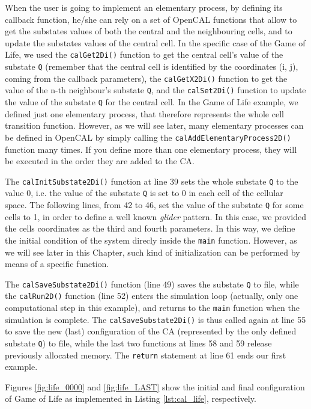 When the user is going to implement an elementary process, by defining
its callback function, he/she can rely on a set of OpenCAL functions that
allow to get the substates values of both the central and the
neighbouring cells, and to update the substates values of the central
cell. In the specific case of the Game of Life, we used the
\verb'calGet2Di()' function to get the central cell's value of the
substate \verb'Q' (remember that the central cell is identified by the
coordinates (i, j), coming from the callback parameters), the
\verb'calGetX2Di()' function to get the value of the n-th neighbour's
substate \verb'Q', and the \verb'calSet2Di()' function to update the
value of the substate \verb'Q' for the central cell. In the Game of
Life example, we defined just one elementary process, that therefore
represents the whole cell transition function. However, as we will see
later, many elementary processes can be defined in OpenCAL by simply
calling the \verb'calAddElementaryProcess2D()' function many times. If
you define more than one elementary process, they will be executed in
the order they are added to the CA.

The \verb'calInitSubstate2Di()' function at line 39 sets the whole
substate \verb'Q' to the value 0, i.e. the value of the substate
\verb'Q' is set to 0 in each cell of the cellular space. The following
lines, from 42 to 46, set the value of the substate \verb'Q' for some
cells to 1, in order to define a well known \emph{glider} pattern. In
this case, we provided the cells coordinates as the third and fourth
parameters. In this way, we define the initial condition of the system
direcly inside the \verb'main' function. However, as we will see later
in this Chapter, such kind of initialization can be performed by means
of a specific function.

The \verb'calSaveSubstate2Di()' function (line 49) saves the substate
\verb'Q' to file, while the \verb'calRun2D()' function (line 52)
enters the simulation loop (actually, only one computational step in
this example), and returns to the \verb'main' function when the
simulation is complete. The \verb'calSaveSubstate2Di()' is thus called
again at line 55 to save the new (last) configuration of the CA
(represented by the only defined substate \verb'Q') to file, while the
last two functions at lines 58 and 59 release previously allocated memory. The
\verb'return' statement at line 61 ends our first example.

Figures \ref{fig:life_0000} and \ref{fig:life_LAST} show the initial and final configuration of Game of Life as implemented in Listing \ref{lst:cal_life}, respectively.

